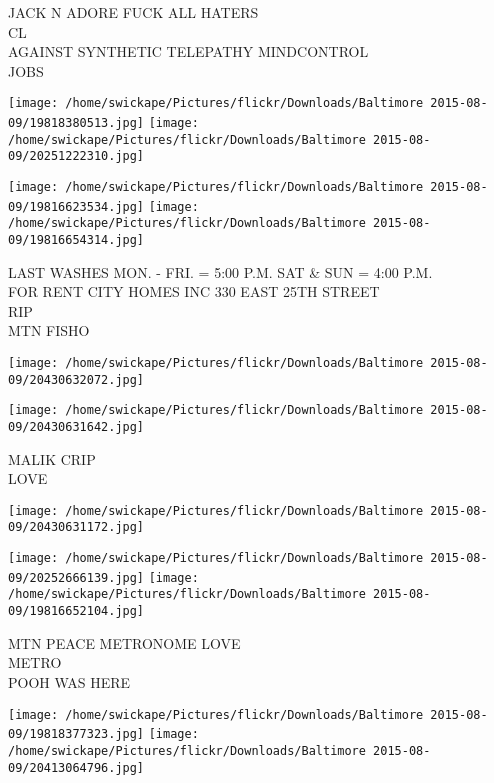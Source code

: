 \documentclass[10pt,letterpaper]{article}
\begin{document}
JACK N ADORE FUCK ALL HATERS\\
CL\\
AGAINST SYNTHETIC TELEPATHY MINDCONTROL\\
JOBS\\
\pagebreak

\texttt{[image: /home/swickape/Pictures/flickr/Downloads/Baltimore 2015-08-09/19818380513.jpg]}
\texttt{[image: /home/swickape/Pictures/flickr/Downloads/Baltimore 2015-08-09/20251222310.jpg]}

\texttt{[image: /home/swickape/Pictures/flickr/Downloads/Baltimore 2015-08-09/19816623534.jpg]}
\texttt{[image: /home/swickape/Pictures/flickr/Downloads/Baltimore 2015-08-09/19816654314.jpg]}

LAST WASHES MON. {-} FRI. = 5:00 P.M. SAT \& SUN = 4:00 P.M.\\
FOR RENT CITY HOMES INC 330 EAST 25TH STREET\\
RIP\\
MTN FISHO\\
\pagebreak

\texttt{[image: /home/swickape/Pictures/flickr/Downloads/Baltimore 2015-08-09/20430632072.jpg]}

\vspace{0.25in}
\texttt{[image: /home/swickape/Pictures/flickr/Downloads/Baltimore 2015-08-09/20430631642.jpg]}

MALIK CRIP\\
LOVE\\
\pagebreak

\texttt{[image: /home/swickape/Pictures/flickr/Downloads/Baltimore 2015-08-09/20430631172.jpg]}

\vspace{0.25in}
\texttt{[image: /home/swickape/Pictures/flickr/Downloads/Baltimore 2015-08-09/20252666139.jpg]}
\texttt{[image: /home/swickape/Pictures/flickr/Downloads/Baltimore 2015-08-09/19816652104.jpg]}

MTN PEACE METRONOME LOVE\\
METRO\\
POOH WAS HERE\\
\pagebreak

\texttt{[image: /home/swickape/Pictures/flickr/Downloads/Baltimore 2015-08-09/19818377323.jpg]}
\texttt{[image: /home/swickape/Pictures/flickr/Downloads/Baltimore 2015-08-09/20413064796.jpg]}
\end{document}
